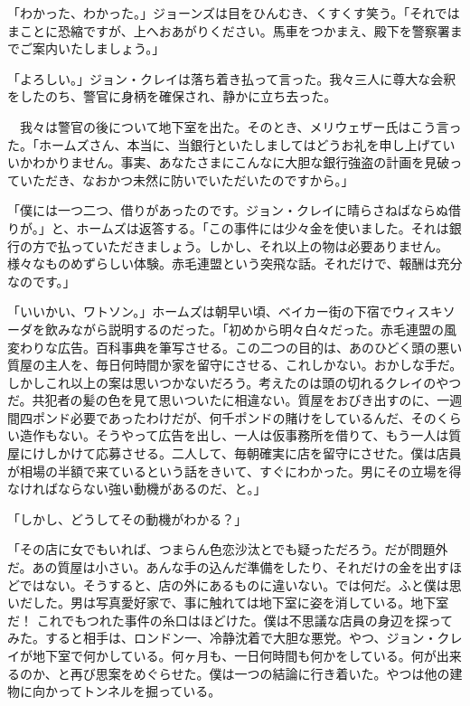 \documentclass[tate,paper=b6j,jafontsize=9pt]{jlreq}
\begin{document}
「わかった、わかった。」ジョーンズは目をひんむき、くすくす笑う。「それではまことに恐縮ですが、上へおあがりください。馬車をつかまえ、殿下を警察署までご案内いたしましょう。」

「よろしい。」ジョン・クレイは落ち着き払って言った。我々三人に尊大な会釈をしたのち、警官に身柄を確保され、静かに立ち去った。

　我々は警官の後について地下室を出た。そのとき、メリウェザー氏はこう言った。「ホームズさん、本当に、当銀行といたしましてはどうお礼を申し上げていいかわかりません。事実、あなたさまにこんなに大胆な銀行強盗の計画を見破っていただき、なおかつ未然に防いでいただいたのですから。」

「僕には一つ二つ、借りがあったのです。ジョン・クレイに晴らさねばならぬ借りが。」と、ホームズは返答する。「この事件には少々金を使いました。それは銀行の方で払っていただきましょう。しかし、それ以上の物は必要ありません。様々なものめずらしい体験。赤毛連盟という突飛な話。それだけで、報酬は充分なのです。」


「いいかい、ワトソン。」ホームズは朝早い頃、ベイカー街の下宿でウィスキソーダを飲みながら説明するのだった。「初めから明々白々だった。赤毛連盟の風変わりな広告。百科事典を筆写させる。この二つの目的は、あのひどく頭の悪い質屋の主人を、毎日何時間か家を留守にさせる、これしかない。おかしな手だ。しかしこれ以上の案は思いつかないだろう。考えたのは頭の切れるクレイのやつだ。共犯者の髪の色を見て思いついたに相違ない。質屋をおびき出すのに、一週間四ポンド必要であったわけだが、何千ポンドの賭けをしているんだ、そのくらい造作もない。そうやって広告を出し、一人は仮事務所を借りて、もう一人は質屋にけしかけて応募させる。二人して、毎朝確実に店を留守にさせた。僕は店員が相場の半額で来ているという話をきいて、すぐにわかった。男にその立場を得なければならない強い動機があるのだ、と。」

「しかし、どうしてその動機がわかる？」

「その店に女でもいれば、つまらん色恋沙汰とでも疑っただろう。だが問題外だ。あの質屋は小さい。あんな手の込んだ準備をしたり、それだけの金を出すほどではない。そうすると、店の外にあるものに違いない。では何だ。ふと僕は思いだした。男は写真愛好家で、事に触れては地下室に姿を消している。地下室だ！ これでもつれた事件の糸口はほどけた。僕は不思議な店員の身辺を探ってみた。すると相手は、ロンドン一、冷静沈着で大胆な悪党。やつ、ジョン・クレイが地下室で何かしている。何ヶ月も、一日何時間も何かをしている。何が出来るのか、と再び思案をめぐらせた。僕は一つの結論に行き着いた。やつは他の建物に向かってトンネルを掘っている。
\end{document}
